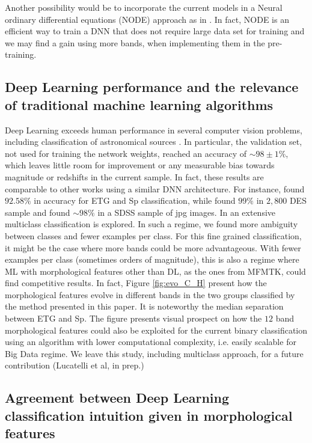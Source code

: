 \documentclass[fleqn,usenatbib]{mnras}
\begin{document}
 Another possibility would be to incorporate the current models in a Neural ordinary differential equations (NODE) approach as in \citet{Gupta2020}. In fact, NODE is an efficient way to train a DNN that does not require large data set for training and we may find a gain using more bands, when implementing them in the pre-training.  

 
 \subsection{Deep Learning performance and the relevance of traditional machine learning algorithms}
 
 Deep Learning exceeds human performance in several computer vision problems, including classification of astronomical sources \cite[see, e.g.][]{challenge01,challenge02,ILSVRC15}. In particular, the validation set, not used for training the network weights, reached an accuracy of $\sim 98 \pm 1\%$, which leaves little room for improvement or any measurable bias towards magnitude or redshifts in the current sample. In fact, these results are comparable to other works using a similar DNN architecture. For instance,  \citet{Kalvankar2020} found $92.58\%$ in accuracy for ETG and Sp classification, while \citet{Cheng2020} found $99\%$ in $2,800$ DES sample and \citet{Farias2020} found $\sim 98 \% $ in a SDSS sample of jpg images. In \citet{Kalvankar2020} an extensive multiclass classification is explored. In such a regime, we found more ambiguity between classes and fewer examples per class. For this fine grained classification, it might be the case where more bands could be more advantageous. With fewer examples per class (sometimes orders of magnitude),  this is also a regime where ML with morphological features  other than DL, as the ones from MFMTK, could find competitive results. In fact, Figure \ref{fig:evo_C_H} present how the morphological features evolve in different bands in the two groups classified by the method presented in this paper. It is noteworthy the median separation between ETG and Sp. The figure presents visual prospect on how the $12$ band morphological features could also be exploited for the current binary classification using an algorithm with lower computational complexity, i.e. easily scalable for Big Data regime. We leave this study, including multiclass approach, for a future contribution (Lucatelli et al, in prep.)

 
 
 
 \subsection{Agreement between Deep Learning classification intuition given in morphological features}
 
\end{document}
